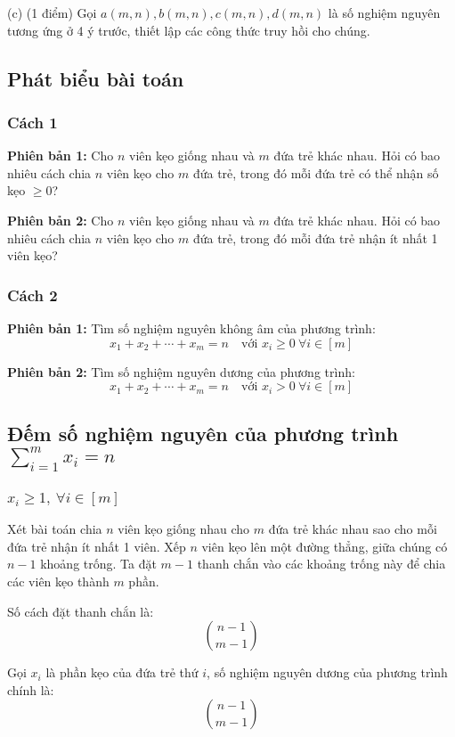 \documentclass{article}
\begin{document}
    (c) {\rm(1 điểm)} Gọi $a(m,n),b(m,n),c(m,n),d(m,n)$ là số nghiệm nguyên tương ứng ở 4 ý trước, thiết lập các công thức truy hồi cho chúng.
	
	\subsection*{Phát biểu bài toán}
	
	\subsubsection*{Cách 1}
	\textbf{Phiên bản 1:} Cho $n$ viên kẹo giống nhau và $m$ đứa trẻ khác nhau. Hỏi có bao nhiêu cách chia $n$ viên kẹo cho $m$ đứa trẻ, trong đó mỗi đứa trẻ có thể nhận số kẹo $\ge 0$?
	
	\textbf{Phiên bản 2:} Cho $n$ viên kẹo giống nhau và $m$ đứa trẻ khác nhau. Hỏi có bao nhiêu cách chia $n$ viên kẹo cho $m$ đứa trẻ, trong đó mỗi đứa trẻ nhận ít nhất 1 viên kẹo?
	
	\subsubsection*{Cách 2}
	\textbf{Phiên bản 1:} Tìm số nghiệm nguyên không âm của phương trình:
	\[
	x_1 + x_2 + \cdots + x_m = n \quad \text{với } x_i \ge 0 \ \forall i \in [m]
	\]
	
	\textbf{Phiên bản 2:} Tìm số nghiệm nguyên dương của phương trình:
	\[
	x_1 + x_2 + \cdots + x_m = n \quad \text{với } x_i > 0 \ \forall i \in [m]
	\]
	
	\subsection*{Đếm số nghiệm nguyên của phương trình $\sum_{i=1}^m x_i = n$}
	
	\subsubsection*{$x_i \ge 1,\ \forall i \in [m]$}
	
	Xét bài toán chia $n$ viên kẹo giống nhau cho $m$ đứa trẻ khác nhau sao cho mỗi đứa trẻ nhận ít nhất 1 viên. Xếp $n$ viên kẹo lên một đường thẳng, giữa chúng có $n-1$ khoảng trống. Ta đặt $m-1$ thanh chắn vào các khoảng trống này để chia các viên kẹo thành $m$ phần.
	
	Số cách đặt thanh chắn là:
	\[
	\binom{n-1}{m-1}
	\]
	
	Gọi $x_i$ là phần kẹo của đứa trẻ thứ $i$, số nghiệm nguyên dương của phương trình chính là:
	\[
	\binom{n-1}{m-1}
	\]
	
\end{document}
